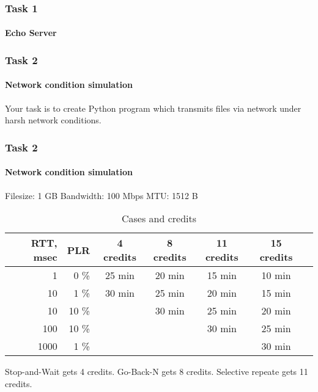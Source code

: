 \begin{frame}		
	\frametitle{Task 1}
	\framesubtitle{Echo Server}
	
	\begin{figure}[H]
	\end{figure}
	
\end{frame}

\begin{frame}[fragile]
	\frametitle{Task 2}
	\framesubtitle{Network condition simulation}
	
Your task is to create Python program which transmits files via network under harsh network conditions.

	
\end{frame}



\begin{frame}[fragile]
	\frametitle{Task 2}
	\framesubtitle{Network condition simulation}

Filesize: 1 GB
Bandwidth: 100 Mbps
MTU: 1512 B	
	
\begin{table}
	\begin{tabular}{ | r | r | c | c | c | c | c | }
		RTT, msec & PLR     & 4 credits & 8 credits   & 11 credits     & 15  credits   \\ \hline \hline
		1         & 0 \%    & 25 min & 20 min & 15 min & 10 min \\ 
		10        & 1 \%    & 30 min & 25 min & 20 min & 15 min \\
		10        & 10 \%   &        & 30 min & 25 min & 20 min \\
		100       & 10 \%   &        &        & 30 min & 25 min \\
		1000      & 1  \%   &        &        &        & 30 min  
	\end{tabular}
	\caption{Cases and credits}
\end{table}

Stop-and-Wait gets 4 credits. Go-Back-N gets 8 credits. Selective repeate gets 11 credits.

\end{frame}


